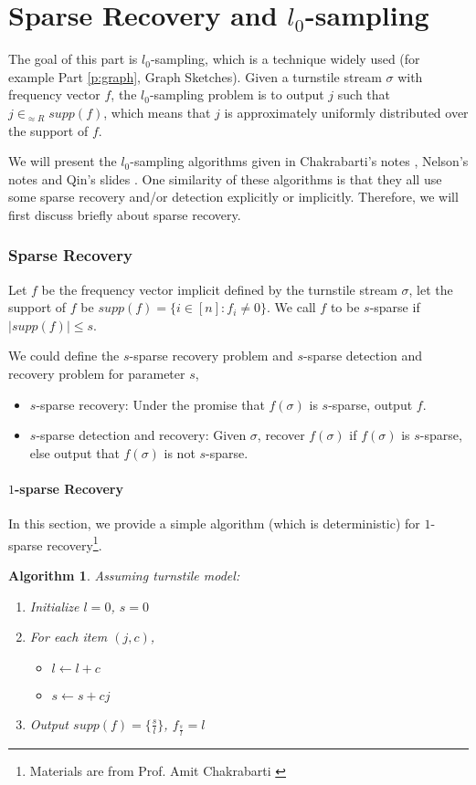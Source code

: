 \documentclass[11pt]{article}
\theoremstyle{plain}
\newtheorem{algorithm}{Algorithm}[section]
\begin{document}
\pagebreak
\part{Sparse Recovery and $l_0$-sampling}
\label{p:sr-l0}

The goal of this part is $l_0$-sampling, which is a technique widely used (for 
example Part \ref{p:graph}, Graph Sketches). 
Given a turnstile stream $\sigma$ with frequency vector $f$, the $l_0$-sampling 
problem is to output $j$ such that $j\in_{\approx R} supp(f)$, which means that 
$j$ is approximately uniformly distributed over the support of $f$.

We will present the $l_0$-sampling algorithms given in Chakrabarti's notes  
\cite{Cha2015-notes}, Nelson's notes  \cite{Nel2015-web} and Qin's slides  
\cite{zhang2017-slides}. One similarity of these algorithms is that they all use 
some sparse recovery and/or detection explicitly or implicitly. Therefore, we will 
first discuss briefly about sparse recovery.


\section{Sparse Recovery}
Let $f$ be the frequency vector implicit defined by the turnstile stream 
$\sigma$, let the support of $f$ be $supp(f)=\{i\in[n]: f_i\neq 0\}$. We call $f$ 
to be $s$-sparse if $|supp(f)|\leq s$.

We could define the $s$-sparse recovery problem and $s$-sparse detection 
and recovery problem for parameter $s$, \begin{itemize}
	\item $s$-sparse recovery: Under the promise that $f(\sigma)$ is 
	$s$-sparse, output $f$.
	\item $s$-sparse detection and recovery: Given $\sigma$, recover 
	$f(\sigma)$ if $f(\sigma)$ is $s$-sparse, else output that $f(\sigma)$ is not 
	$s$-sparse.
\end{itemize}

\subsection{$1$-sparse Recovery}
In this section, we provide a simple algorithm (which is deterministic) for 
$1$-sparse recovery\footnote{Materials are from Prof. Amit 
Chakrabarti  \cite{Cha2015-notes}}.

\begin{algorithm}
\label{al:1sparse}
Assuming turnstile model:
\begin{enumerate}
	\item Initialize $l=0$, $s=0$
	\item For each item $(j,c)$,
	\begin{itemize}
		\item $l\leftarrow l +c$
		\item $s\leftarrow s+cj$
	\end{itemize}
	\item Output $supp(f)=\{\frac{s}{l}\}$, $f_{\frac{s}{l}}=l$
\end{enumerate}
\end{algorithm}
\end{document}
